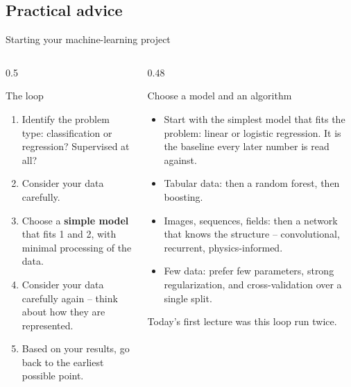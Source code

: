 \documentclass[10pt,aspectratio=169]{beamer}
\begin{document}
\subsection{Practical advice}

\begin{frame}{Starting your machine-learning project}
\begin{columns}[T]
\begin{column}{0.5\textwidth}
\small
\begin{block}{The loop}
\begin{enumerate}
  \item Identify the problem type: classification or regression?
    Supervised at all?
  \item Consider your data carefully.
  \item Choose a \textbf{simple model} that fits 1 and 2, with minimal
    processing of the data.
  \item Consider your data carefully again -- think about how they are
    represented.
  \item Based on your results, go back to the earliest possible point.
\end{enumerate}
\end{block}
\end{column}
\begin{column}{0.48\textwidth}
\small
\begin{block}{Choose a model and an algorithm}
\footnotesize
\begin{itemize}
  \item Start with the simplest model that fits the problem: linear or
    logistic regression.  It is the baseline every later number is read
    against.
  \item Tabular data: then a random forest, then boosting.
  \item Images, sequences, fields: then a network that knows the structure
    -- convolutional, recurrent, physics-informed.
  \item Few data: prefer few parameters, strong regularization, and
    cross-validation over a single split.
\end{itemize}
\end{block}
Today's first lecture was this loop run twice.
\end{column}
\end{columns}
\end{frame}
\end{document}
